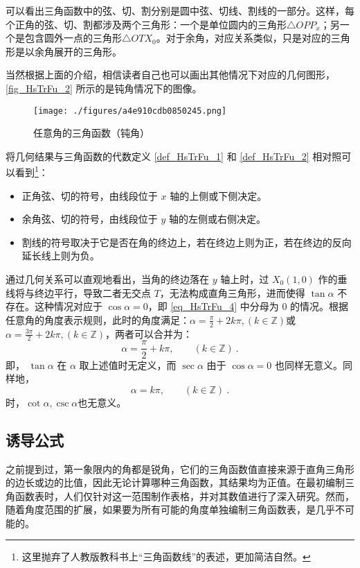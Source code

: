 可以看出三角函数中的弦、切、割分别是圆中弦、切线、割线的一部分。这样，每个正角的弦、切、割都涉及两个三角形：一个是单位圆内的三角形$\triangle OPP_x$；另一个是包含圆外一点的三角形$\triangle OTX_0$。对于余角，对应关系类似，只是对应的三角形是以余角展开的三角形。

当然根据上面的介绍，相信读者自己也可以画出其他情况下对应的几何图形，\autoref{fig_HsTrFu_2} 所示的是钝角情况下的图像。
\begin{figure}[ht]
\centering
\texttt{[image: ./figures/a4e910cdb0850245.png]}
\caption{任意角的三角函数（钝角）} \label{fig_HsTrFu_2}
\end{figure}
将几何结果与三角函数的代数定义 \autoref{def_HsTrFu_1} 和 \autoref{def_HsTrFu_2} 相对照可以看到\footnote{这里抛弃了人教版教科书上“三角函数线”的表述，更加简洁自然。}：
\begin{itemize}
\item 正角弦、切的符号，由线段位于 $x$ 轴的上侧或下侧决定。
\item 余角弦、切的符号，由线段位于 $y$ 轴的左侧或右侧决定。
\item 割线的符号取决于它是否在角的终边上，若在终边上则为正，若在终边的反向延长线上则为负。
\end{itemize}

通过几何关系可以直观地看出，当角的终边落在 $y$ 轴上时，过 $X_0(1,0)$ 作的垂线将与终边平行，导致二者无交点 $T$，无法构成直角三角形，进而使得 $\tan\alpha$ 不存在。这种情况对应于 $\cos\alpha = 0$，即 \autoref{eq_HsTrFu_4} 中分母为 $0$ 的情况。根据任意角的角度表示规则，此时的角度满足：$\displaystyle\alpha=\frac{\pi}{2}+2k\pi,(k\in\mathbb{Z})$或$\displaystyle\alpha=\frac{3\pi}{2}+2k\pi,(k\in\mathbb{Z})$，两者可以合并为：
\begin{equation}
\alpha=\frac{\pi}{2}+k\pi,\qquad(k\in\mathbb{Z})~.
\end{equation}
即， $\tan\alpha$ 在 $\alpha$ 取上述值时无定义，而 $\sec\alpha$ 由于 $\cos\alpha = 0$ 也同样无意义。同样地，
\begin{equation}\label{eq_HsTrFu_6}
\alpha=k\pi,\qquad(k\in\mathbb{Z})~.
\end{equation}
时，$\cot\alpha,\csc\alpha$也无意义。

\subsection{诱导公式}

之前提到过，第一象限内的角都是锐角，它们的三角函数值直接来源于直角三角形的边长或边的比值，因此无论计算哪种三角函数，其结果均为正值。在最初编制三角函数表时，人们仅针对这一范围制作表格，并对其数值进行了深入研究。然而，随着角度范围的扩展，如果要为所有可能的角度单独编制三角函数表，是几乎不可能的。

